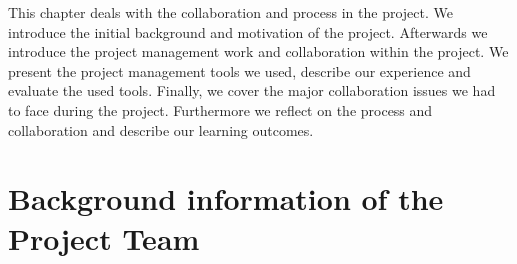 This chapter deals with the collaboration and process in the project. We introduce the initial background and motivation of the project. Afterwards we introduce the project management work and collaboration within the project. We present the project management tools we used, describe our experience and evaluate the used tools.
Finally, we cover the major collaboration issues we had to face during the project. Furthermore we reflect on the process and collaboration and describe our learning outcomes.










\section{Background information of the Project Team}
\label{sec:background}

